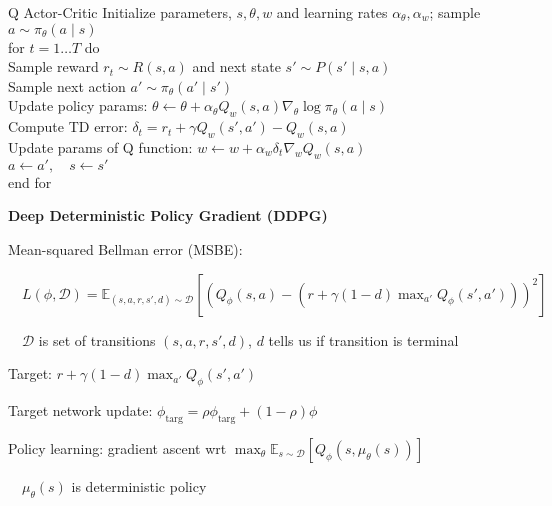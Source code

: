 \documentclass[twocolumn]{article}
\begin{document}
\begin{mydef}{Q Actor-Critic}{}
    Initialize parameters, $s, \theta, w$ and learning rates $\alpha_\theta, \alpha_w$; sample $a \sim \pi_\theta(a \mid s)$ \\
    for $t = 1 \dots T$ do \\
        \hspace*{2em}Sample reward $r_t \sim R(s, a)$ and next state $s' \sim P (s' \mid s, a)$ \\
        \hspace*{2em}Sample next action $a' \sim \pi_\theta(a' \mid s')$ \\
        \hspace*{2em}Update policy params: $\theta \leftarrow \theta + \alpha_\theta Q_w(s, a) \nabla_\theta \log \pi_\theta (a\mid s)$ \\
        \hspace*{2em}Compute TD error: $\delta_t = r_t + \gamma Q_w(s', a') - Q_w(s, a)$ \\
        \hspace*{2em}Update params of Q function: $w \leftarrow w + \alpha_w \delta_t \nabla_w Q_w(s, a)$ \\
        \hspace*{2em}$a \leftarrow a', \quad s \leftarrow s'$ \\
    end for
\end{mydef}

\dotfill

\textbf{Deep Deterministic Policy Gradient (DDPG)}

Mean-squared Bellman error (MSBE):

$\quad L(\phi, \mathcal D) = \mathbb E_{(s,a,r,s',d) \sim \mathcal D} \left[ \left( Q_\phi(s,a) - (r + \gamma(1-d) \max_{a'} Q_\phi(s', a')) \right)^2 \right]$

$\quad \mathcal D$ is set of transitions $(s, a, r, s', d)$, $d$ tells us if transition is terminal

Target: $r + \gamma (1-d) \max_{a'} Q_\phi(s', a')$

Target network update: $\phi_{\text{targ}} = \rho \phi_{\text{targ}} + (1-\rho)\phi$

Policy learning: gradient ascent wrt $\max_\theta \mathbb E_{s \sim \mathcal D} [Q_\phi(s, \mu_\theta(s))]$

$\quad \mu_\theta(s)$ is deterministic policy
\end{document}
